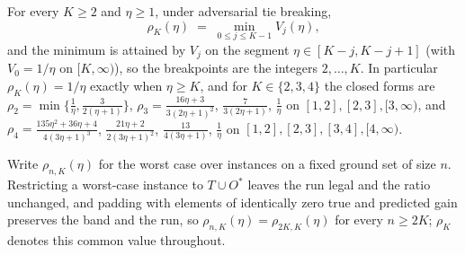\begin{theorem}\label{thm:exact}
For every $K\ge2$ and $\eta\ge1$, under adversarial tie breaking,
\[
  \rho_K(\eta)\;=\;\min_{0\le j\le K-1}V_j(\eta),
\]
and the minimum is attained by $V_j$ on the segment
$\eta\in[K-j,K-j+1]$ (with $V_0=1/\eta$ on $[K,\infty)$), so the breakpoints
are the integers $2,\dots,K$.  In particular
$\rho_K(\eta)=1/\eta$ exactly when $\eta\ge K$, and for $K\in\{2,3,4\}$ the
closed forms are
$\rho_2=\min\{\tfrac1\eta,\tfrac{3}{2(\eta+1)}\}$,
$\rho_3=\tfrac{16\eta+3}{3(2\eta+1)^2}$, $\tfrac{7}{3(2\eta+1)}$,
$\tfrac1\eta$ on $[1,2],[2,3],[3,\infty)$, and
$\rho_4=\tfrac{135\eta^2+36\eta+4}{4(3\eta+1)^3}$,
$\tfrac{21\eta+2}{2(3\eta+1)^2}$, $\tfrac{13}{4(3\eta+1)}$, $\tfrac1\eta$ on
$[1,2],[2,3],[3,4],[4,\infty)$.
\end{theorem}
\begin{remark}\label{rem:exact-n}
Write $\rho_{n,K}(\eta)$ for the worst case over instances on a fixed
ground set of size $n$.  Restricting a worst-case instance to
$T\cup O^{\ast}$ leaves the run legal and the ratio unchanged, and padding
with elements of identically zero true and predicted gain preserves the
band and the run, so $\rho_{n,K}(\eta)=\rho_{2K,K}(\eta)$ for every
$n\ge2K$; $\rho_K$ denotes this common value throughout.
\end{remark}

